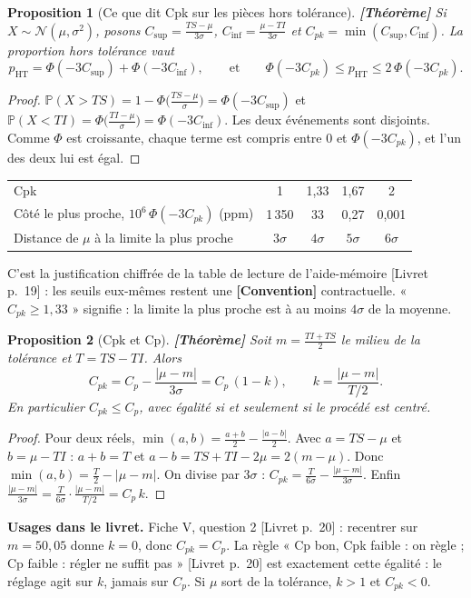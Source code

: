 \documentclass[11pt,a4paper]{article}
\theoremstyle{tq}
\newtheorem{prop}{Proposition}
\theoremstyle{remark}
\newcommand{\thm}{\textcolor{vertTQ}{\textbf{[Théorème]}}}
\newcommand{\conv}{\textcolor{orangeTQ}{\textbf{[Convention]}}}
\newcommand{\liv}[1]{\textcolor{uimmblue}{\small[Livret p.~#1]}}
\renewcommand{\P}{\mathbb{P}}
\newcommand{\N}{\mathcal{N}}
\begin{document}
\begin{prop}[Ce que dit Cpk sur les pièces hors tolérance]\thm{}
Si $X\sim\N(\mu,\sigma^2)$, posons $C_{\text{sup}}=\frac{TS-\mu}{3\sigma}$, $C_{\text{inf}}=\frac{\mu-TI}{3\sigma}$ et $C_{pk}=\min(C_{\text{sup}},C_{\text{inf}})$. La proportion hors tolérance vaut
\[
p_{\text{HT}}=\Phi(-3C_{\text{sup}})+\Phi(-3C_{\text{inf}}),\qquad\text{et}\qquad \Phi(-3C_{pk})\le p_{\text{HT}}\le2\,\Phi(-3C_{pk}).
\]
\end{prop}
\begin{proof}
$\P(X>TS)=1-\Phi\big(\frac{TS-\mu}\sigma\big)=\Phi(-3C_{\text{sup}})$ et $\P(X<TI)=\Phi\big(\frac{TI-\mu}{\sigma}\big)=\Phi(-3C_{\text{inf}})$. Les deux événements sont disjoints. Comme $\Phi$ est croissante, chaque terme est compris entre $0$ et $\Phi(-3C_{pk})$, et l'un des deux lui est égal.
\end{proof}
\begin{center}\small
\begin{tabular}{@{}lcccc@{}}
\toprule
Cpk & 1 & 1,33 & 1,67 & 2\\
Côté le plus proche, $10^6\,\Phi(-3C_{pk})$ (ppm) & 1\,350 & 33 & 0,27 & 0,001\\
Distance de $\mu$ à la limite la plus proche & $3\sigma$ & $4\sigma$ & $5\sigma$ & $6\sigma$\\
\bottomrule
\end{tabular}
\end{center}
C'est la justification chiffrée de la table de lecture de l'aide-mémoire \liv{19} : les seuils eux-mêmes restent une \conv{} contractuelle. « $C_{pk}\ge1{,}33$ » signifie : la limite la plus proche est à au moins $4\sigma$ de la moyenne.

\begin{prop}[Cpk et Cp]\thm{}
Soit $m=\frac{TI+TS}2$ le milieu de la tolérance et $T=TS-TI$. Alors
\[
C_{pk}=C_p-\frac{|\mu-m|}{3\sigma}=C_p\,(1-k),\qquad k=\frac{|\mu-m|}{T/2}.
\]
En particulier $C_{pk}\le C_p$, avec égalité si et seulement si le procédé est centré.
\end{prop}
\begin{proof}
Pour deux réels, $\min(a,b)=\frac{a+b}2-\frac{|a-b|}2$. Avec $a=TS-\mu$ et $b=\mu-TI$ : $a+b=T$ et $a-b=TS+TI-2\mu=2(m-\mu)$. Donc $\min(a,b)=\frac T2-|\mu-m|$. On divise par $3\sigma$ : $C_{pk}=\frac{T}{6\sigma}-\frac{|\mu-m|}{3\sigma}$. Enfin $\frac{|\mu-m|}{3\sigma}=\frac{T}{6\sigma}\cdot\frac{|\mu-m|}{T/2}=C_p\,k$.
\end{proof}
\textbf{Usages dans le livret.} Fiche V, question 2 \liv{20} : recentrer sur $m=50{,}05$ donne $k=0$, donc $C_{pk}=C_p$. La règle « Cp bon, Cpk faible : on règle ; Cp faible : régler ne suffit pas » \liv{20} est exactement cette égalité : le réglage agit sur $k$, jamais sur $C_p$. Si $\mu$ sort de la tolérance, $k>1$ et $C_{pk}<0$.
\end{document}
